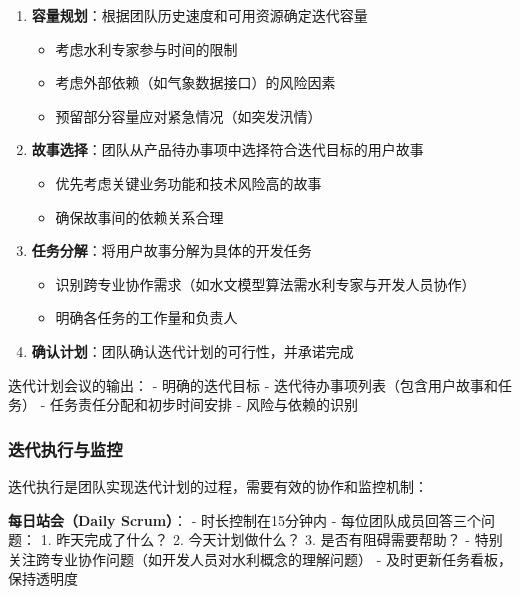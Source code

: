 \begin{enumerate}
\def\labelenumi{\arabic{enumi}.}
\setcounter{enumi}{1}
\tightlist
\item
  \textbf{容量规划}：根据团队历史速度和可用资源确定迭代容量

  \begin{itemize}
  \tightlist
  \item
    考虑水利专家参与时间的限制
  \item
    考虑外部依赖（如气象数据接口）的风险因素
  \item
    预留部分容量应对紧急情况（如突发汛情）
  \end{itemize}
\item
  \textbf{故事选择}：团队从产品待办事项中选择符合迭代目标的用户故事

  \begin{itemize}
  \tightlist
  \item
    优先考虑关键业务功能和技术风险高的故事
  \item
    确保故事间的依赖关系合理
  \end{itemize}
\item
  \textbf{任务分解}：将用户故事分解为具体的开发任务

  \begin{itemize}
  \tightlist
  \item
    识别跨专业协作需求（如水文模型算法需水利专家与开发人员协作）
  \item
    明确各任务的工作量和负责人
  \end{itemize}
\item
  \textbf{确认计划}：团队确认迭代计划的可行性，并承诺完成
\end{enumerate}

迭代计划会议的输出： - 明确的迭代目标 -
迭代待办事项列表（包含用户故事和任务） - 任务责任分配和初步时间安排 -
风险与依赖的识别

\subsubsection{迭代执行与监控}\label{ux8fedux4ee3ux6267ux884cux4e0eux76d1ux63a7}

迭代执行是团队实现迭代计划的过程，需要有效的协作和监控机制：

\textbf{每日站会（Daily Scrum）}： - 时长控制在15分钟内 -
每位团队成员回答三个问题： 1. 昨天完成了什么？ 2. 今天计划做什么？ 3.
是否有阻碍需要帮助？ -
特别关注跨专业协作问题（如开发人员对水利概念的理解问题） -
及时更新任务看板，保持透明度

